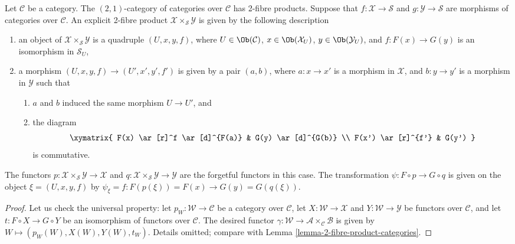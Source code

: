\begin{lemma}
\label{lemma-2-product-categories-over-C}
Let $\mathcal{C}$ be a category.
The $(2, 1)$-category of categories
over $\mathcal{C}$ has 2-fibre products.
Suppose that
$f : \mathcal{X} \to \mathcal{S}$ and
$g : \mathcal{Y} \to \mathcal{S}$ are morphisms of categories over
$\mathcal{C}$.
An explicit 2-fibre product
$\mathcal{X} \times_\mathcal{S}\mathcal{Y}$ is given by the following
description
\begin{enumerate}
\item an object of $\mathcal{X} \times_\mathcal{S} \mathcal{Y}$ is a quadruple
$(U, x, y, f)$, where $U \in \Ob(\mathcal{C})$,
$x\in \Ob(\mathcal{X}_U)$, $y\in \Ob(\mathcal{Y}_U)$,
and $f : F(x) \to G(y)$ is an isomorphism in $\mathcal{S}_U$,
\item a morphism $(U, x, y, f) \to (U', x', y', f')$ is given by a pair
$(a, b)$, where $a : x \to x'$ is a morphism in $\mathcal{X}$, and
$b : y \to y'$ is a
morphism in $\mathcal{Y}$ such that
\begin{enumerate}
\item $a$ and $b$ induced the same morphism $U \to U'$, and
\item the diagram
$$
\xymatrix{
F(x) \ar[r]^f \ar[d]^{F(a)} & G(y) \ar[d]^{G(b)} \\
F(x') \ar[r]^{f'} & G(y')
}
$$
is commutative.
\end{enumerate}
\end{enumerate}
The functors $p : \mathcal{X} \times_\mathcal{S}\mathcal{Y} \to \mathcal{X}$
and $q : \mathcal{X} \times_\mathcal{S}\mathcal{Y} \to \mathcal{Y}$ are the
forgetful functors in this case. The transformation $\psi : F \circ p \to
G \circ q$ is given on the object $\xi = (U, x, y, f)$ by
$\psi_\xi = f : F(p(\xi)) = F(x) \to G(y) = G(q(\xi))$.
\end{lemma}

\begin{proof}
Let us check the universal property: let $p_W : \mathcal{W}\to \mathcal{C}$
be a category over $\mathcal{C}$, let $X : \mathcal{W} \to \mathcal{X}$ and
$Y : \mathcal{W} \to \mathcal{Y}$ be functors over $\mathcal{C}$, and let
$t : F \circ X \to G \circ Y$ be an isomorphism of functors over $\mathcal{C}$.
The desired functor
$\gamma : \mathcal{W} \to \mathcal{A} \times_\mathcal{C}\mathcal{B}$
is given by $W \mapsto (p_W(W), X(W), Y(W), t_W)$.
Details omitted; compare with Lemma \ref{lemma-2-fibre-product-categories}.
\end{proof}

